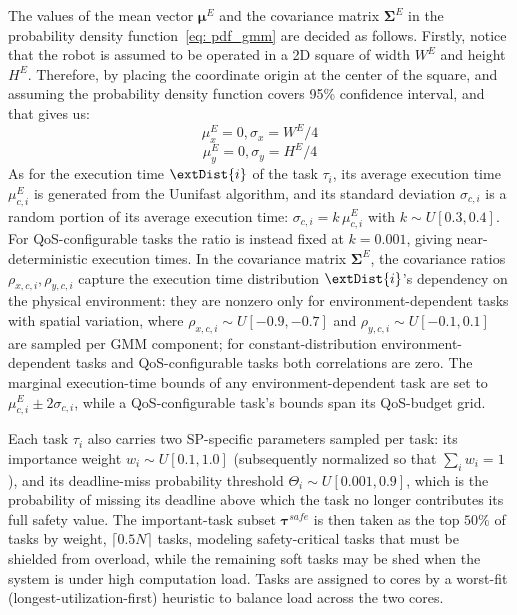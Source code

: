     The values of the mean vector $\boldsymbol{\mu}^E$ and the covariance matrix $ \boldsymbol{\Sigma}^E$ in the probability density function~\eqref{eq: pdf_gmm} are decided as follows.
    Firstly, notice that the robot is assumed to be operated in a 2D square of width $W^E$ and height $H^E$. Therefore, by placing the coordinate origin at the center of the square, and assuming the probability density function covers 95\% confidence interval, and that gives us:
    \begin{equation}
        \mu^E_x = 0, \sigma_x = W^E/4
    \end{equation}
    \begin{equation}
        \mu^E_y = 0, \sigma_y = H^E/4
    \end{equation}
    As for the execution time $\extDist{i}$ of the task $\tau_i$, its average execution time $\mu^E_{c,i}$ is generated from the Uunifast algorithm, and its standard deviation $\sigma_{c,i}$ is a random portion of its average execution time: $\sigma_{c,i}=k\,\mu^E_{c,i}$ with $k \sim U[0.3, 0.4]$. For QoS-configurable tasks the ratio is instead fixed at $k = 0.001$, giving near-deterministic execution times.
    In the covariance matrix $\boldsymbol{\Sigma}^E$, the covariance ratios $\rho_{x,c,i}, \rho_{y,c,i}$ capture the execution time distribution $\extDist{i}$'s dependency on the physical environment: they are nonzero only for environment-dependent tasks with spatial variation, where $\rho_{x,c,i} \sim U[-0.9, -0.7]$ and $\rho_{y,c,i} \sim U[-0.1, 0.1]$ are sampled per GMM component;
    for constant-distribution environment-dependent tasks and QoS-configurable tasks both correlations are zero.
    The marginal execution-time bounds of any environment-dependent task are set to $\mu^E_{c,i} \pm 2\sigma_{c,i}$, while a QoS-configurable task's bounds span its QoS-budget grid.

    Each task $\tau_i$ also carries two SP-specific parameters sampled per task: its importance weight $w_i \sim U[0.1, 1.0]$ (subsequently normalized so that $\sum_i w_i = 1$), and its deadline-miss probability threshold $\Theta_i \sim U[0.001, 0.9]$, which is the probability of missing its deadline above which the task no longer contributes its full safety value.
    The important-task subset $\boldsymbol{\tau}^{safe}$ is then taken as the top $50\%$ of tasks by weight, $\lceil 0.5 N \rceil$ tasks, modeling safety-critical tasks that must be shielded from overload, while the remaining soft tasks may be shed when the system is under high computation load.
    Tasks are assigned to cores by a worst-fit (longest-utilization-first) heuristic to balance load across the two cores.

